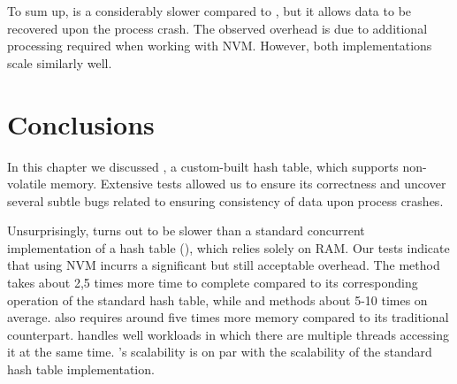     To sum up, \PHT is a considerably slower compared to \StandardHashMap, but it allows data to be recovered upon the process crash. The observed overhead is due to additional processing required when working with NVM. 
    However, both implementations scale similarly well. 
            
\section{Conclusions}
        
    In this chapter we discussed \PHT, a custom-built hash table, which supports non-volatile memory. 
    Extensive tests allowed us to ensure its correctness and uncover several subtle bugs related to ensuring consistency of data upon process crashes.
    
    Unsurprisingly, \PHT turns out to be slower than a standard concurrent implementation of a hash table (\StandardHashMap), which relies solely on RAM. Our tests indicate that using NVM incurrs a significant but still acceptable overhead.
    The \getMethod method takes about 2,5 times more time to complete compared to its corresponding operation of the standard hash table, while \insertMethod and \removeMethod methods about 5-10 times on average. \PHT also requires around five times more memory compared to its traditional counterpart. \PHT handles well workloads in which there are multiple threads accessing it at the same time. \PHT's scalability is on par with the scalability of the standard hash table implementation.
    
